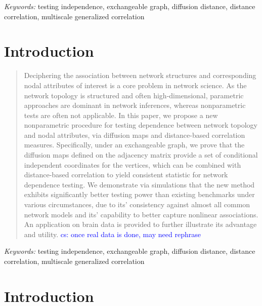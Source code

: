 \documentclass[11pt]{article}
\theoremstyle{definition}
\newcommand{\cs}[1]{\textcolor{blue}{cs: #1}}
\begin{document}
	\noindent%
	{\it Keywords:} testing independence, exchangeable graph, diffusion distance, distance correlation, multiscale generalized correlation
	
	\sloppy
	\doublespacing
	
	\section{Introduction}
	\label{sec:intro}
	


\begin{abstract}
Deciphering the association between network structures and corresponding nodal attributes of interest is a core problem in network science. As the network topology is structured and often high-dimensional, parametric approaches are dominant in network inferences, whereas nonparametric tests are often not applicable. In this paper, we propose a new nonparametric procedure for testing dependence between network topology and nodal attributes, via diffusion maps and distance-based correlation measures. Specifically, under an exchangeable graph, we prove that the diffusion maps defined on the adjacency matrix provide a set of conditional independent coordinates for the vertices, which can be combined with distance-based correlation to yield consistent statistic for network dependence testing. We demonstrate via simulations that the new method exhibits significantly better testing power than existing benchmarks under various circumstances, due to its' consistency against almost all common network models and its' capability to better capture nonlinear associations. An application on brain data is provided to further illustrate its advantage and utility. \cs{once real data is done, may need rephrase}
\end{abstract}

\noindent%
{\it Keywords:} testing independence, exchangeable graph, diffusion distance, distance correlation, multiscale generalized correlation

\sloppy
\doublespacing

\section{Introduction}
\label{sec:intro}
\end{document}
